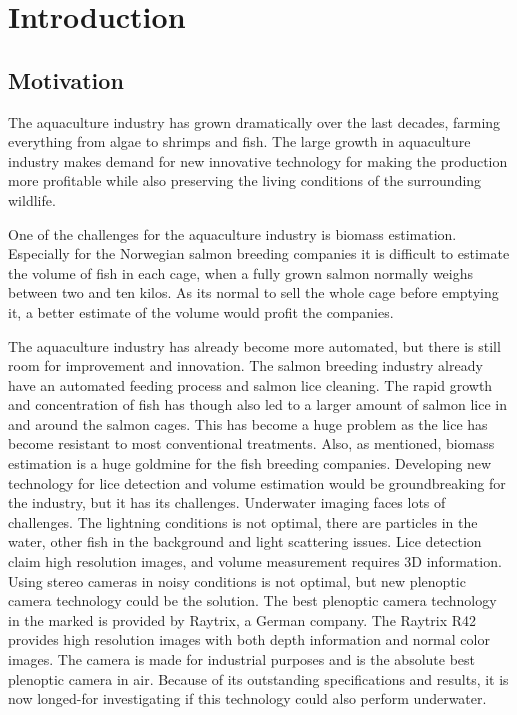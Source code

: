 \section{Introduction}\label{introduction}

\subsection{Motivation}\label{motivation}

The aquaculture industry has grown dramatically over the last decades, farming everything from algae to shrimps and fish. The large growth in aquaculture industry makes demand for new innovative technology for making the production more profitable while also preserving the living conditions of the surrounding wildlife. 

One of the challenges for the aquaculture industry is biomass estimation. Especially for the Norwegian salmon breeding companies it is difficult to estimate the volume of fish in each cage, when a fully grown salmon normally weighs between two and ten kilos. As its normal to sell the whole cage before emptying it, a better estimate of the volume would profit the companies.

The aquaculture industry has already become more automated, but there is still room for improvement and innovation. The salmon breeding industry already have an automated feeding process and salmon lice cleaning. The rapid growth and concentration of fish has though also led to a larger amount of salmon lice in and around the salmon cages. This has become a huge problem as the lice has become resistant to most conventional treatments. Also, as mentioned, biomass estimation is a huge goldmine for the fish breeding companies. Developing new technology for lice detection and volume estimation would be groundbreaking for the industry, but it has its challenges.
Underwater imaging faces lots of challenges. The lightning conditions is not optimal, there are particles in the water, other fish in the background and light scattering issues. Lice detection claim high resolution images, and volume measurement requires 3D information. Using stereo cameras in noisy conditions is not optimal, but new plenoptic camera technology could be the solution. The best plenoptic camera technology in the marked is provided by Raytrix, a German company. The Raytrix R42 provides high resolution images with both depth information and normal color images. The camera is made for industrial purposes and is the absolute best plenoptic camera in air. Because of its outstanding specifications and results, it is now longed-for investigating if this technology could also perform underwater. 

